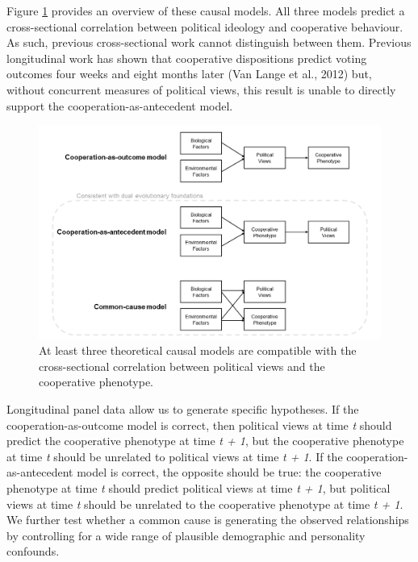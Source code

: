 \documentclass[
  man,floatsintext]{apa6}
\begin{document}
Figure \ref{fig:theoreticalModels} provides an overview of these causal
models. All three models predict a cross-sectional correlation between political
ideology and cooperative behaviour. As such, previous cross-sectional work
cannot distinguish between them. Previous longitudinal work has shown that
cooperative dispositions predict voting outcomes four weeks and eight months
later (Van Lange et al., 2012) but, without concurrent measures of political views, this
result is unable to directly support the cooperation-as-antecedent model.





\begin{figure}
\includegraphics[width=\textwidth]{images/theoreticalModels} \caption{At least three theoretical causal models are
compatible with the cross-sectional correlation between political views and
the cooperative phenotype.}\label{fig:theoreticalModels}
\end{figure}

Longitudinal panel data allow us to generate specific hypotheses. If the
cooperation-as-outcome model is correct, then political views at time \emph{t} should
predict the cooperative phenotype at time \emph{t + 1}, but the cooperative phenotype
at time \emph{t} should be unrelated to political views at time \emph{t + 1}. If the
cooperation-as-antecedent model is correct, the opposite should be true: the
cooperative phenotype at time \emph{t} should predict political views at time
\emph{t + 1}, but political views at time \emph{t} should be unrelated to the cooperative
phenotype at time \emph{t + 1}. We further test whether a common cause is generating
the observed relationships by controlling for a wide range of plausible
demographic and personality confounds.
\end{document}
